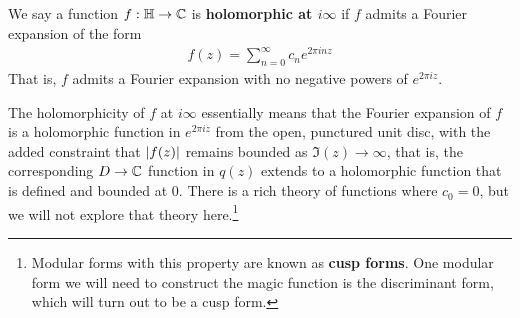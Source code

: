 
\begin{boxdefinition}\label{Ch2:Def:Holo_at_ImInfty}
    We say a function $f : \mathbb{H} \to \mathbb{C}$ is \textbf{holomorphic at $i\infty$} if $f$ admits a Fourier expansion of the form
    \begin{align*}
        f(z) = \sum_{n=0}^{\infty} c_n e^{2\pi i nz}
    \end{align*}
    That is, $f$ admits a Fourier expansion with no negative powers of $e^{2\pi i z}$.
\end{boxdefinition}

The holomorphicity of $f$ at $i\infty$ essentially means that the Fourier expansion of $f$ is a holomorphic function in $e^{2 \pi i z}$ from the open, punctured unit disc, with the added constraint that $\left\lvert f(z) \right\rvert$ remains bounded as $\Im(z) \to \infty$, that is, the corresponding $D \to \mathbb{C}$ function in $q(z)$ extends to a holomorphic function that is defined and bounded at $0$. There is a rich theory of functions where $c_0 = 0$, but we will not explore that theory here.\footnote{Modular forms with this property are known as \textbf{cusp forms}. One modular form we will need to construct the magic function is the discriminant form, which will turn out to be a cusp form.}

